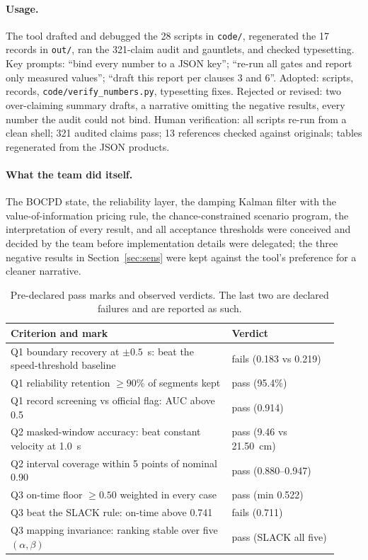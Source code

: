 \documentclass{swmcmthesis}
\begin{document}
\paragraph{Usage.} The tool drafted and debugged the 28 scripts in \texttt{code/}, regenerated the 17 records in \texttt{out/}, ran the 321-claim audit and gauntlets, and checked typesetting. Key prompts: ``bind every number to a JSON key''; ``re-run all gates and report only measured values''; ``draft this report per clauses 3 and 6''. Adopted: scripts, records, \texttt{code/verify\_numbers.py}, typesetting fixes. Rejected or revised: two over-claiming summary drafts, a narrative omitting the negative results, every number the audit could not bind. Human verification: all scripts re-run from a clean shell; 321 audited claims pass; 13 references checked against originals; tables regenerated from the JSON products.
\paragraph{What the team did itself.} The BOCPD state, the reliability layer, the damping Kalman filter with the value-of-information pricing rule, the chance-constrained scenario program, the interpretation of every result, and all acceptance thresholds were conceived and decided by the team before implementation details were delegated; the three negative results in Section~\ref{sec:sens} were kept against the tool's preference for a cleaner narrative.

\begin{table}[tbp]\centering\footnotesize
\caption{Pre-declared pass marks and observed verdicts. The last two are declared failures and are reported as such.}\label{tab:pass}
\begin{tabular}{@{}p{0.62\linewidth}p{0.30\linewidth}@{}}
\toprule
Criterion and mark & Verdict \\
\midrule
Q1 boundary recovery at $\pm0.5$~s: beat the speed-threshold baseline & fails (0.183 vs 0.219) \\
Q1 reliability retention $\geq 90\%$ of segments kept & pass (95.4\%) \\
Q1 record screening vs official flag: AUC above 0.5 & pass (0.914) \\
Q2 masked-window accuracy: beat constant velocity at 1.0~s & pass (9.46 vs 21.50~cm) \\
Q2 interval coverage within 5 points of nominal 0.90 & pass (0.880--0.947) \\
Q3 on-time floor $\geq 0.50$ weighted in every case & pass (min 0.522) \\
Q3 beat the SLACK rule: on-time above 0.741 & fails (0.711) \\
Q3 mapping invariance: ranking stable over five $(\alpha,\beta)$ & pass (SLACK all five) \\
\bottomrule
\end{tabular}
\end{table}
\end{document}
